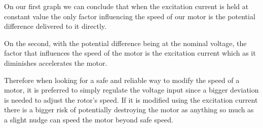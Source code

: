 \documentclass[11pt, openright]{book}
\begin{document}
\begin{figure}[ht]
	\begin{floatrow}
		
		
	\end{floatrow}
\end{figure}

On our first graph we can conclude that when the excitation current is held at constant value the only factor influencing the speed of our motor is the potential difference delivered to it directly. 

On the second, with the potential difference being at the nominal voltage, the factor that influences the speed of the motor is the excitation current which as it diminishes accelerates the motor. 

Therefore when looking for a safe and reliable way to modify the speed of a motor, it is preferred to simply regulate the voltage input since a bigger deviation is needed to adjust the rotor's speed. If it is modified using the excitation current there is a bigger risk of potentially destroying the motor as anything so much as a slight nudge can speed the motor beyond safe speed.  
\end{document}
